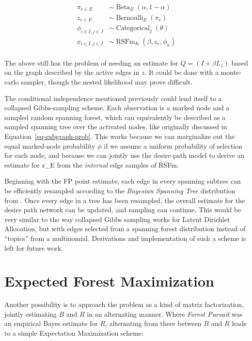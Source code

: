 \documentclass[%
	12pt,
		oneside,
		letterpaper
]{book}
\begin{document}
\[
\begin{aligned}
\pi_{e\in E} &\sim \operatorname{Beta}_E(\alpha, 1-\alpha)     \\
z_{e\in E} &\sim \operatorname{Bernoulli}_E(\pi_e)             \\
\phi_{i\in I, j\in J} &\sim \operatorname{Categorical}_I(\theta) \\
x_{i\in I,j\in J} &\sim \operatorname{RSFm}_K(\beta, z_e, \phi_n) \\
\end{aligned}
\]

The above still has the problem of needing an estimate for
\(Q=(I+\beta L_z)\) based on the graph described by the active edges in
\(z\). It could be done with a monte-carlo sampler, though the nested
likelihood may prove difficult.

The conditional independence mentioned previously could lend itself to a
collapsed Gibbs-sampling scheme. Each observation is a marked node and a
sampled random spanning forest, which can equivalently be described as a
sampled spanning tree over the activated nodes, like originally
discussed in Equation~\ref{eq-subgraph-prob}. This works because we can
marginalize out the equal marked-node probability \(\phi\) if we assume
a uniform probability of selection for each node, and because we can
jointly use the desire-path model to derive an estimate for z\_E from
the \emph{internal} edge samples of RSFm.

Beginning with the FP point estimate, each edge in every spanning
subtree can be efficiently resampled according to the \emph{Bayesian
Spanning Tree} distribution from
\textcite{BayesianSpanningTree_Duan2021}. Once every edge in a tree has
been resampled, the overall estimate for the desire path network can be
updated, and sampling can continue. This would be very similar to the
way collapsed Gibbs sampling works for Latent Dirichlet
Allocation\autocite{Latentdirichletallocation_Blei2003}, but with edges
selected from a spanning forest distribution instead of ``topics'' from
a multinomial. Derivations and implementation of such a scheme is left
for future work.

\section{Expected Forest
Maximization}\label{expected-forest-maximization}

Another possibility is to approach the problem as a kind of matrix
factorization, jointly estimating \(B\) and \(R\) in an alternating
manner. Where \emph{Forest Pursuit} was an empirical Bayes estimate for
\(R\), alternating from there between \(B\) and \(R\) leads to a simple
Expectation Maximization scheme:
\end{document}
